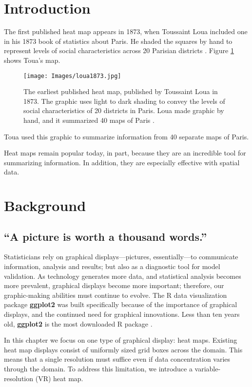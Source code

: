 \section{Introduction}

The first published heat map appears in 1873, when Toussaint Loua included one in his 1873 book of statistics about Paris. He shaded the squares by hand to represent levels of social characteristics across 20 Parisian districts \citep{Friendly2009}. Figure \ref{fig:toua} shows Toua's map. 
  \begin{figure}[H]
	\centering
	\texttt{[image: Images/loua1873.jpg]} 
  \caption{The earliest published heat map, published by Toussaint Loua in 1873. The graphic uses light to dark shading to convey the levels of social characteristics of 20 districts in Paris. Loua made graphic by hand, and it summarized 40 maps of Paris \citep{Friendly2009}.}
  \label{fig:toua}
	\end{figure}
Toua used this graphic to summarize information from 40 separate maps of Paris. 

Heat maps remain popular today, in part, because they are an incredible tool for summarizing information. In addition, they are especially effective with spatial data.

\section{Background} \label{ch2background}

\subsection{``A picture is worth a thousand words.''} 

Statisticians rely on graphical displays---pictures, essentially---to communicate information, analysis and results; but also as a diagnostic tool for model validation. As technology generates more data, and statistical analysis becomes more prevalent, graphical displays become more important; therefore, our graphic-making abilities must continue to evolve. The R data visualization package {\bf ggplot2} \citep{Wickham2009} was built specifically because of the importance of graphical displays, and the continued need for graphical innovations. Less than ten years old, {\bf ggplot2} is the most downloaded R package \citep{rdoc}.

In this chapter we focus on one type of graphical display: heat maps. Existing heat map displays consist of uniformly sized grid boxes across the domain. This means that a single resolution must suffice even if data concentration varies through the domain. To address this limitation, we introduce a variable-resolution (VR) heat map.

